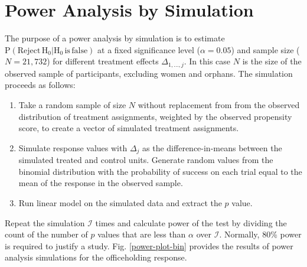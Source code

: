 \chapter{Power Analysis by Simulation}\label{oa-power}

The purpose of a power analysis by simulation is to estimate $\mathrm{P}(\mathrm{Reject \, H_0} | \mathrm{H_0 \, is \, false})$ at a fixed significance level ($\alpha =0.05$) and sample size ($N=21,732$) for different treatment effects $\Delta_{1, \ldots, j}$. In this case $N$ is the size of the observed sample of participants, excluding women and orphans. The simulation proceeds as follows:

\begin{enumerate}
	\item Take a random sample of size $N$ without replacement from from the observed distribution of treatment assignments, weighted by the observed propensity score, to create a vector of simulated treatment assignments.
	\item Simulate response values with $\Delta_{j}$ as the difference-in-means between the simulated treated and control units. Generate random values from the binomial distribution with the probability of success on each trial equal to the mean of the response in the observed sample.
	\item Run linear model on the simulated data and extract the $p$ value.
\end{enumerate}

Repeat the simulation $\mathcal{I}$ times and calculate power of the test by dividing the count of the number of $p$ values that are less than $\alpha$ over $\mathcal{I}$. Normally, 80\% power is required to justify a study.  Fig. \ref{power-plot-bin} provides the results of power analysis simulations for the officeholding response. 
